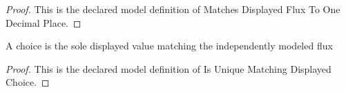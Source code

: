 \begin{proof}
  This is the declared model definition of Matches Displayed Flux To One Decimal Place.
\end{proof}
\begin{definition}
  \label{def:physics:phyx-mini-0844:phyxminiproblems-problemphyxmini0844-isuniquematchingdisplayedchoice}
  A choice is the sole displayed value matching the independently modeled flux
\end{definition}
\begin{proof}
  This is the declared model definition of Is Unique Matching Displayed Choice.
\end{proof}
